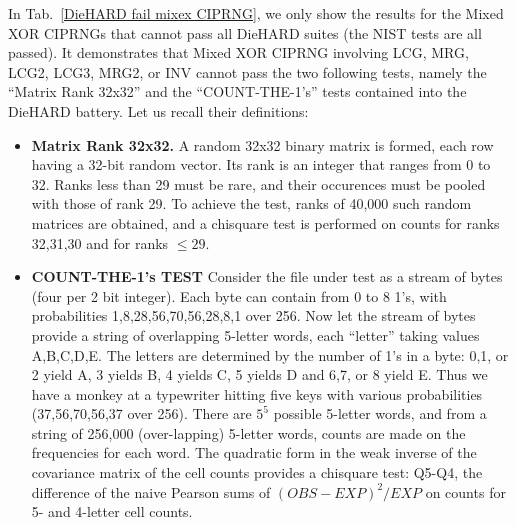 
In Tab.~\ref{DieHARD fail mixex CIPRNG}, we only show the results for the Mixed XOR CIPRNGs that cannot pass all DieHARD suites (the NIST tests are all passed). It demonstrates that Mixed XOR CIPRNG involving LCG, MRG, LCG2, LCG3, MRG2, or INV cannot pass the two following tests, namely the ``Matrix Rank 32x32'' and the ``COUNT-THE-1's'' tests contained into the DieHARD battery. Let us recall their definitions:

\begin{itemize}
 \item \textbf{Matrix Rank 32x32.} A random 32x32 binary matrix is formed, each row having a 32-bit random vector. Its rank is an integer that ranges from 0 to 32. Ranks less than 29 must be rare, and their occurences must be pooled with those of rank 29. To achieve the test, ranks of 40,000 such random matrices are obtained, and a chisquare test is performed on counts for ranks 32,31,30 and for ranks $\leq29$.

 \item \textbf{COUNT-THE-1's TEST} Consider the file under test as a stream of bytes (four per  2 bit integer).  Each byte can contain from 0 to 8 1's, with probabilities 1,8,28,56,70,56,28,8,1 over 256.  Now let the stream of bytes provide a string of overlapping  5-letter words, each ``letter'' taking values A,B,C,D,E. The letters are determined by the number of 1's in a byte: 0,1, or 2 yield A, 3 yields B, 4 yields C, 5 yields D and 6,7, or 8 yield E. Thus we have a monkey at a typewriter hitting five keys with various probabilities (37,56,70,56,37 over 256).  There are $5^5$ possible 5-letter words, and from a string of 256,000 (over-lapping) 5-letter words, counts are made on the frequencies for each word.   The quadratic form in the weak inverse of the covariance matrix of the cell counts provides a chisquare test: Q5-Q4, the difference of the naive Pearson sums of $(OBS-EXP)^2/EXP$ on counts for 5- and 4-letter cell counts.
\end{itemize}

